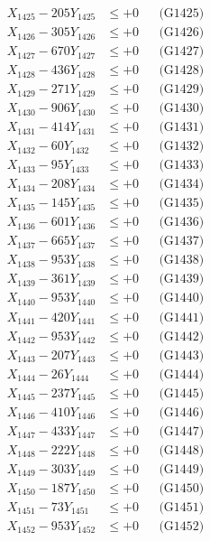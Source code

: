 \documentclass[a4paper,10pt]{article}
\begin{document}
{\begin{align}
X_{1425} - 205Y_{1425} &\leq +0 && \text{(G1425)} \\
X_{1426} - 305Y_{1426} &\leq +0 && \text{(G1426)} \\
X_{1427} - 670Y_{1427} &\leq +0 && \text{(G1427)} \\
X_{1428} - 436Y_{1428} &\leq +0 && \text{(G1428)} \\
X_{1429} - 271Y_{1429} &\leq +0 && \text{(G1429)} \\
X_{1430} - 906Y_{1430} &\leq +0 && \text{(G1430)} \\
\allowbreak
X_{1431} - 414Y_{1431} &\leq +0 && \text{(G1431)} \\
X_{1432} - 60Y_{1432} &\leq +0 && \text{(G1432)} \\
X_{1433} - 95Y_{1433} &\leq +0 && \text{(G1433)} \\
X_{1434} - 208Y_{1434} &\leq +0 && \text{(G1434)} \\
X_{1435} - 145Y_{1435} &\leq +0 && \text{(G1435)} \\
X_{1436} - 601Y_{1436} &\leq +0 && \text{(G1436)} \\
X_{1437} - 665Y_{1437} &\leq +0 && \text{(G1437)} \\
X_{1438} - 953Y_{1438} &\leq +0 && \text{(G1438)} \\
X_{1439} - 361Y_{1439} &\leq +0 && \text{(G1439)} \\
X_{1440} - 953Y_{1440} &\leq +0 && \text{(G1440)} \\
\allowbreak
X_{1441} - 420Y_{1441} &\leq +0 && \text{(G1441)} \\
X_{1442} - 953Y_{1442} &\leq +0 && \text{(G1442)} \\
X_{1443} - 207Y_{1443} &\leq +0 && \text{(G1443)} \\
X_{1444} - 26Y_{1444} &\leq +0 && \text{(G1444)} \\
X_{1445} - 237Y_{1445} &\leq +0 && \text{(G1445)} \\
X_{1446} - 410Y_{1446} &\leq +0 && \text{(G1446)} \\
X_{1447} - 433Y_{1447} &\leq +0 && \text{(G1447)} \\
X_{1448} - 222Y_{1448} &\leq +0 && \text{(G1448)} \\
X_{1449} - 303Y_{1449} &\leq +0 && \text{(G1449)} \\
X_{1450} - 187Y_{1450} &\leq +0 && \text{(G1450)} \\
\allowbreak
X_{1451} - 73Y_{1451} &\leq +0 && \text{(G1451)} \\
X_{1452} - 953Y_{1452} &\leq +0 && \text{(G1452)} \\

\end{align}}
\end{document}
